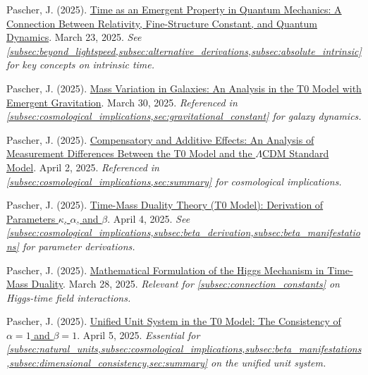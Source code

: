 \documentclass[12pt,a4paper]{article}
\begin{document}
	\begin{thebibliography}{99}
		 Pascher, J. (2025). \href{https://github.com/jpascher/T0-Time-Mass-Duality/tree/main/2/pdf/English/ZeitEmergentQMEn.pdf}{Time as an Emergent Property in Quantum Mechanics: A Connection Between Relativity, Fine-Structure Constant, and Quantum Dynamics}. March 23, 2025. \textit{See \cref{subsec:beyond_lightspeed,subsec:alternative_derivations,subsec:absolute_intrinsic} for key concepts on intrinsic time.}
		
		 Pascher, J. (2025). \href{https://github.com/jpascher/T0-Time-Mass-Duality/tree/main/2/pdf/English/MassVarGalaxienEn.pdf}{Mass Variation in Galaxies: An Analysis in the T0 Model with Emergent Gravitation}. March 30, 2025. \textit{Referenced in \cref{subsec:cosmological_implications,sec:gravitational_constant} for galaxy dynamics.}
		
		 Pascher, J. (2025). \href{https://github.com/jpascher/T0-Time-Mass-Duality/tree/main/2/pdf/English/MessdifferenzenT0StandardEn.pdf}{Compensatory and Additive Effects: An Analysis of Measurement Differences Between the T0 Model and the $\Lambda$CDM Standard Model}. April 2, 2025. \textit{Referenced in \cref{subsec:cosmological_implications,sec:summary} for cosmological implications.}
		
		 Pascher, J. (2025). \href{https://github.com/jpascher/T0-Time-Mass-Duality/tree/main/2/pdf/English/ZeitMasseT0ParamsEn.pdf}{Time-Mass Duality Theory (T0 Model): Derivation of Parameters $\kappa$, $\alpha$, and $\beta$}. April 4, 2025. \textit{See \cref{subsec:cosmological_implications,subsec:beta_derivation,subsec:beta_manifestations} for parameter derivations.}
		
		 Pascher, J. (2025). \href{https://github.com/jpascher/T0-Time-Mass-Duality/tree/main/2/pdf/English/MathHiggsZeitMasseEn.pdf}{Mathematical Formulation of the Higgs Mechanism in Time-Mass Duality}. March 28, 2025. \textit{Relevant for \cref{subsec:connection_constants} on Higgs-time field interactions.}
		
		 Pascher, J. (2025). \href{https://github.com/jpascher/T0-Time-Mass-Duality/tree/main/2/pdf/English/Alpha1Beta1KonsistenzEn.pdf}{Unified Unit System in the T0 Model: The Consistency of $\alpha = 1$ and $\beta = 1$}. April 5, 2025. \textit{Essential for \cref{subsec:natural_units,subsec:cosmological_implications,subsec:beta_manifestations,subsec:dimensional_consistency,sec:summary} on the unified unit system.}
		

\end{thebibliography}
\end{document}
